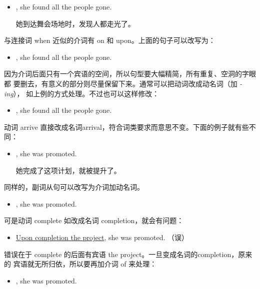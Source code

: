 \begin{itemize}
\item {}, she found all the people gone.

  她到达舞会场地时，发现人都走光了。
\end{itemize}
与连接词 when 近似的介词有 on 和 upon。上面的句子可以改写为：
\begin{itemize}
\item {}, she found all the people gone.
\end{itemize}

因为介词后面只有一个宾语的空间，所以句型要大幅精简，所有重复、空洞的字眼都
要删去，有意义的部分则尽量保留下来。通常可以把动词改成动名词（加 \emph{-ing}），
如上例的方式处理。不过也可以这样修改：
\begin{itemize}
\item {}, she found all the people gone.
\end{itemize}
动词 arrive 直接改成名词arrival，符合词类要求而意思不变。下面的例子就有些不
同：
\begin{itemize}
\item {}, she was promoted.

  她完成了这项计划，就被提升了。
\end{itemize}
同样的，副词从句可以改写为介词加动名词。
\begin{itemize}
\item {}, she was promoted.
\end{itemize}

可是动词 complete 如改成名词 completion，就会有问题：
\begin{itemize}
\item \ul{Upon completion the project}, she was promoted. （误）
\end{itemize}
错误在于 complete 的后面有宾语 the project。一旦变成名词的completion，原来的
宾语就无所归依，所以要再加介词 of 来处理：

\begin{itemize}
\item {}, she was promoted.
\end{itemize}

